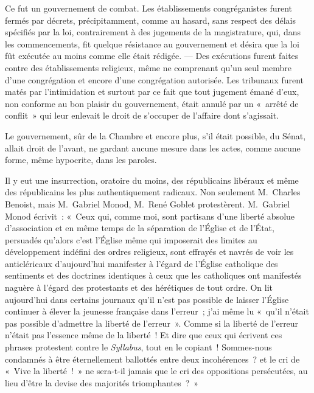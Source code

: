 \documentclass[french,twoside]{book} %
\begin{document}
\noindent Ce fut un gouvernement de combat. Les établissements congréganistes furent fermés par décrets, précipitamment, comme au hasard, sans respect des délais spécifiés par la loi, contrairement à des  jugements de la magistrature, qui, dans les commencements, fit quelque résistance au gouvernement et désira que la loi fût exécutée au moins comme elle était rédigée. — Des exécutions furent faites contre des établissements religieux, même ne comprenant qu’un seul membre d’une congrégation et encore d’une congrégation autorisée. Les tribunaux furent matés par l’intimidation et surtout par ce fait que tout jugement émané d’eux, non conforme au bon plaisir du gouvernement, était annulé par un « arrêté de conflit » qui leur enlevait le droit de s’occuper de l’affaire dont s’agissait.\par
Le gouvernement, sûr de la Chambre et encore plus, s’il était possible, du Sénat, allait droit de l’avant, ne gardant aucune mesure dans les actes, comme aucune forme, même hypocrite, dans les paroles.\par
Il y eut une insurrection, oratoire du moins, des républicains libéraux et même des républicains les plus authentiquement radicaux. Non seulement M. Charles Benoist, mais M. Gabriel Monod, M. René Goblet protestèrent. M. Gabriel Monod écrivit : « Ceux qui, comme moi, sont partisans d’une liberté absolue d’association et en même temps de la séparation de l’Église et de l’État, persuadés qu’alors c’est l’Église même qui imposerait des limites au développement indéfini des ordres religieux, sont  effrayés et navrés de voir les anticléricaux d’aujourd’hui manifester à l’égard de l’Église catholique des sentiments et des doctrines identiques à ceux que les catholiques ont manifestés naguère à l’égard des protestants et des hérétiques de tout ordre. On lit aujourd’hui dans certains journaux qu’il n’est pas possible de laisser l’Église continuer à élever la jeunesse française dans l’erreur ; j’ai même lu « qu’il n’était pas possible d’admettre la liberté de l’erreur ». Comme si la liberté de l’erreur n’était pas l’essence même de la liberté ! Et dire que ceux qui écrivent ces phrases protestent contre le \emph{Syllabus}, tout en le copiant ! Sommes-nous condamnés à être éternellement ballottés entre deux incohérences ? et le cri de « Vive la liberté ! » ne sera-t-il jamais que le cri des oppositions persécutées, au lieu d’être la devise des majorités triomphantes ? »\par
\end{document}
